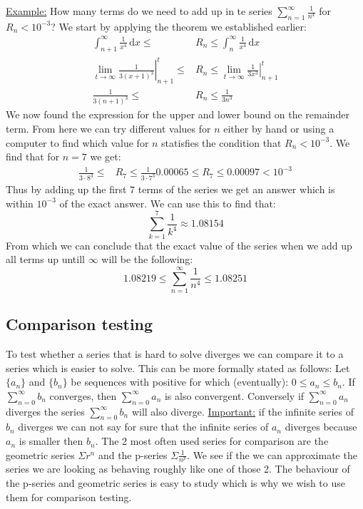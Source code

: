 \documentclass[11pt, a4paper]{article}
\renewcommand*{\d}{\text{d}}
\numberwithin{equation}{section}
\numberwithin{figure}{section}
\begin{document}
\underline{Example:} How many terms do we need to add up in te series $\sum_{n=1}^\infty \frac{1}{n^4}$ for $R_n < 10^{-3}$?
We start by applying the theorem we established earlier:
\begin{align*}
  \int_{n+1}^\infty \frac{1}{x^4}\,\d x \leq &R_n \leq \int_n^\infty \frac{1}{x^4}\,\d x\\
  \lim_{t \to\infty} \left. \frac{1}{3(x+1)^3} \right|_{n+1}^t \leq &R_n \leq \lim_{t\to\infty} \left. \frac{1}{3x^3} \right|_{n+1}^t\\
  \frac{1}{3(n+1)^3} \leq &R_n \leq \frac{1}{3n^3}
\end{align*}
We now found the expression for the upper and lower bound on the remainder term. From here we can try different values for $n$ either by hand or using a computer to find which value for $n$ statisfies the condition that $R_n < 10^{-3}$. We find that for $n=7$ we get:
\begin{align*}
  \frac{1}{3\cdot 8^3} \leq &R_7 \leq \frac{1}{3\cdot 7^3}
  0.00065 \leq R_7 \leq 0.00097 < 10^{-3}
\end{align*}
Thus by adding up the first $7$ terms of the series we get an answer which is within $10^{-3}$ of the exact answer. We can use this to find that:
\begin{equation*}
  \sum_{k=1}^7 \frac{1}{k^4} \approx 1.08154
\end{equation*}
From which we can conclude that the exact value of the series when we add up all terms up untill $\infty$ will be the following:
\begin{equation*}
  1.08219 \leq \sum_{n=1}^\infty \frac{1}{n^4} \leq 1.08251
\end{equation*}


\subsection{Comparison testing}
To test whether a series that is hard to solve diverges we can compare it to a series which is easier to solve. This can be more formally stated as follows: Let $\{ a_n \}$ and $\{ b_n \}$ be sequences with positive for which (eventually): $0 \leq a_n \leq b_n$. If $\sum_{n=0}^\infty b_n$ converges, then   $\sum_{n=0}^\infty a_n$ is also convergent. Conversely if $\sum_{n=0}^\infty a_n$ diverges the series $\sum_{n=0}^\infty b_n$ will also diverge. \underline{Important:} if the infinite series of $b_n$ diverges we can not say for sure that the infinite series of $a_n$ diverges because $a_n$ is smaller then $b_n$.
The 2 most often used series for comparison are the geometric series $\Sigma r^n$ and the p-series $\Sigma \frac{1}{n^p}$. We see if the we can approximate the series we are looking as behaving roughly like one of those 2. The behaviour of the p-series and geometric series is easy to study which is why we wish to use them for comparison testing.
\end{document}
